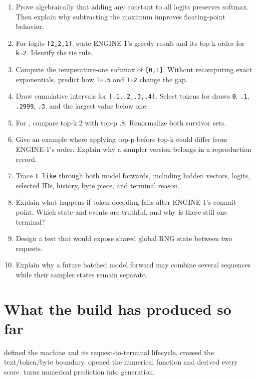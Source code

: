 \begin{enumerate}
\def\labelenumi{\arabic{enumi}.}
\tightlist
\item
  Prove algebraically that adding any constant to all logits preserves
  softmax. Then explain why subtracting the maximum improves
  floating-point behavior.
\item
  For logits \texttt{{[}2,2,1{]}}, state ENGINE-1's greedy result and
  its top-k order for \texttt{k=2}. Identify the tie rule.
\item
  Compute the temperature-one softmax of \texttt{{[}0,1{]}}. Without
  recomputing exact exponentials, predict how \texttt{T=.5} and
  \texttt{T=2} change the gap.
\item
  Draw cumulative intervals for \texttt{{[}.1,.2,.3,.4{]}}. Select
  tokens for draws \texttt{0}, \texttt{.1}, \texttt{.2999}, \texttt{.3},
  and the largest value below one.
\item
  For \texttt{\seqsplit{[.40,.30,.15,.10,.05]}}, compare top-k 2 with
  top-p .8. Renormalize both survivor sets.
\item
  Give an example where applying top-p before top-k could differ from
  ENGINE-1's order. Explain why a sampler version belongs in a
  reproduction record.
\item
  Trace \texttt{I\ like} through both model forwards, including hidden
  vectors, logits, selected IDs, history, byte piece, and terminal
  reason.
\item
  Explain what happens if token decoding fails after ENGINE-1's commit
  point. Which state and events are truthful, and why is there still one
  terminal?
\item
  Design a test that would expose shared global RNG state between two
  requests.
\item
  Explain why a future batched model forward may combine several
  sequences while their sampler states remain separate.
\end{enumerate}

\section{What the build has produced so far}\label{what-part-i-has-built}

 defined the machine and its request-to-terminal lifecycle.
 crossed the text/token/byte boundary.  opened the
numerical function and derived every score.  turns numerical
prediction into generation.

